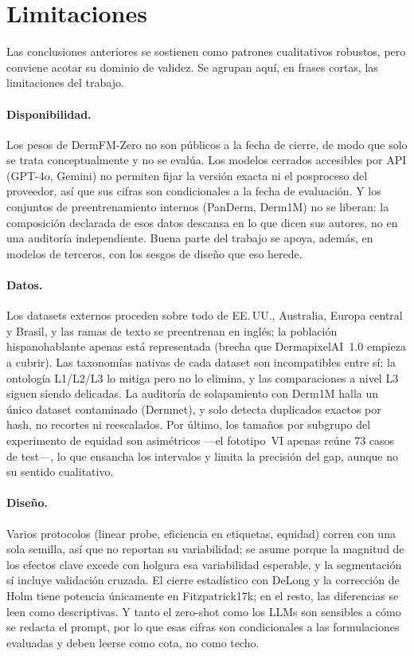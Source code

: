 \section{Limitaciones}
\label{cap:limitaciones}

Las conclusiones anteriores se sostienen como patrones cualitativos
robustos, pero conviene acotar su dominio de validez. Se agrupan aquí,
en frases cortas, las limitaciones del trabajo.

\paragraph{Disponibilidad.}
\label{sec:lim-pesos}
Los pesos de DermFM-Zero no son públicos a la fecha de cierre, de modo
que solo se trata conceptualmente y no se evalúa. Los modelos cerrados
accesibles por API (GPT-4o, Gemini) no permiten fijar la versión exacta
ni el posproceso del proveedor, así que sus cifras son condicionales a la
fecha de evaluación. Y los conjuntos de preentrenamiento internos
(PanDerm, Derm1M) no se liberan: la composición declarada de esos datos
descansa en lo que dicen sus autores, no en una auditoría independiente.
Buena parte del trabajo se apoya, además, en modelos de terceros, con los
sesgos de diseño que eso herede.

\paragraph{Datos.}
\label{sec:lim-leakage}
\label{sec:lim-muestrales}
Los datasets externos proceden sobre todo de EE.\,UU., Australia, Europa
central y Brasil, y las ramas de texto se preentrenan en inglés; la
población hispanohablante apenas está representada (brecha que
DermapixelAI~1.0 empieza a cubrir). Las taxonomías nativas de cada
dataset son incompatibles entre sí: la ontología L1/L2/L3 lo mitiga pero
no lo elimina, y las comparaciones a nivel L3 siguen siendo delicadas. La
auditoría de solapamiento con Derm1M halla un único dataset contaminado
(Dermnet), y solo detecta duplicados exactos por hash, no recortes ni
reescalados. Por último, los tamaños por subgrupo del experimento de
equidad son asimétricos ---el fototipo~VI apenas reúne $73$ casos de
test---, lo que ensancha los intervalos y limita la precisión del gap,
aunque no su sentido cualitativo.

\paragraph{Diseño.}
\label{sec:lim-semilla}
\label{sec:lim-estadistica}
Varios protocolos (linear probe, eficiencia en etiquetas, equidad)
corren con una sola semilla, así que no reportan su variabilidad; se
asume porque la magnitud de los efectos clave excede con holgura esa
variabilidad esperable, y la segmentación sí incluye validación cruzada.
El cierre estadístico con DeLong y la corrección de Holm tiene potencia
únicamente en Fitzpatrick17k; en el resto, las diferencias se leen como
descriptivas. Y tanto el zero-shot como los LLMs son sensibles a cómo se
redacta el prompt, por lo que esas cifras son condicionales a las
formulaciones evaluadas y deben leerse como cota, no como techo.

